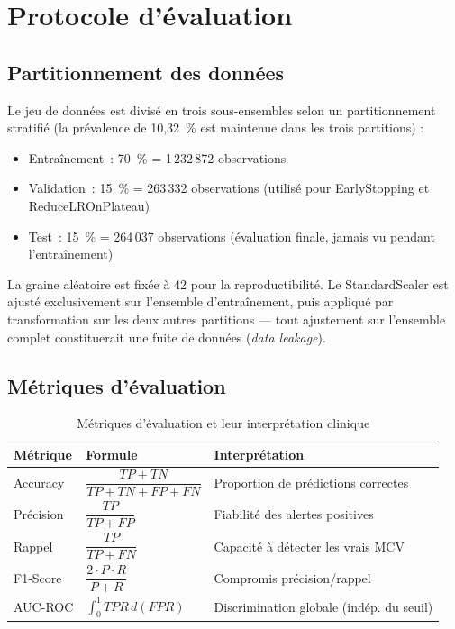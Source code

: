 \section{Protocole d'évaluation}

\subsection{Partitionnement des données}

Le jeu de données est divisé en trois sous-ensembles selon un partitionnement stratifié (la prévalence de 10,32~\% est maintenue dans les trois partitions) :

\begin{itemize}
    \item Entraînement~: 70~\% = 1\,232\,872 observations
    \item Validation~: 15~\% = 263\,332 observations (utilisé pour EarlyStopping et ReduceLROnPlateau)
    \item Test~: 15~\% = 264\,037 observations (évaluation finale, jamais vu pendant l'entraînement)
\end{itemize}

La graine aléatoire est fixée à 42 pour la reproductibilité. Le StandardScaler est ajusté exclusivement sur l'ensemble d'entraînement, puis appliqué par transformation sur les deux autres partitions — tout ajustement sur l'ensemble complet constituerait une fuite de données (\textit{data leakage}).

\subsection{Métriques d'évaluation}

\begin{table}[H]
\centering
\caption{Métriques d'évaluation et leur interprétation clinique}
\label{tab:metriques}
\begin{tabular}{lll}
\toprule
\textbf{Métrique} & \textbf{Formule} & \textbf{Interprétation} \\
\midrule
Accuracy  & $\dfrac{TP+TN}{TP+TN+FP+FN}$                           & Proportion de prédictions correctes \\[6pt]
Précision & $\dfrac{TP}{TP+FP}$                                     & Fiabilité des alertes positives \\[6pt]
Rappel    & $\dfrac{TP}{TP+FN}$                                     & Capacité à détecter les vrais MCV \\[6pt]
F1-Score  & $\dfrac{2 \cdot P \cdot R}{P+R}$                        & Compromis précision/rappel \\[6pt]
AUC-ROC   & $\displaystyle\int_0^1 TPR \, d(FPR)$                   & Discrimination globale (indép. du seuil) \\
\bottomrule
\end{tabular}
\end{table}

